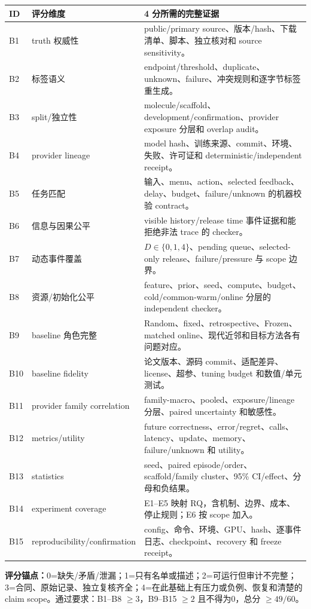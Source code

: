 \documentclass[10pt,letterpaper]{article}
\newcommand{\sect}[1]{\vspace{4pt}{\large\bfseries\color{GuideBlue}#1}\par\vspace{2pt}}
\newenvironment{clean}{\begin{center}\fontsize{8.55}{10.05}\selectfont\setlength{\tabcolsep}{3.7pt}\renewcommand{\arraystretch}{1.04}}{\end{center}}
\begin{document}
\sect{5. B1--B15 评分对象与门槛}
\begin{clean}
\begin{tabular}{@{}p{.08\linewidth}p{.27\linewidth}p{.51\linewidth}@{}}
\toprule
ID & 评分维度 & 4 分所需的完整证据\\
\midrule
B1 & truth 权威性 & public/primary source、版本/hash、下载清单、脚本、独立核对和 source sensitivity。\\
B2 & 标签语义 & endpoint/threshold、duplicate、unknown、failure、冲突规则和逐字节标签重生成。\\
B3 & split/独立性 & molecule/scaffold、development/confirmation、provider exposure 分层和 overlap audit。\\
B4 & provider lineage & model hash、训练来源、commit、环境、失败、许可证和 deterministic/independent receipt。\\
B5 & 任务匹配 & 输入、menu、action、selected feedback、delay、budget、failure/unknown 的机器校验 contract。\\
B6 & 信息与因果公平 & visible history/release time 事件证据和能拒绝非法 trace 的 checker。\\
B7 & 动态事件覆盖 & $D\in\{0,1,4\}$、pending queue、selected-only release、failure/pressure 与 scope 边界。\\
B8 & 资源/初始化公平 & feature、prior、seed、compute、budget、cold/common-warm/online 分层的 independent checker。\\
B9 & baseline 角色完整 & Random、fixed、retrospective、Frozen、matched online、现代近邻和目标方法各有问题对应。\\
B10 & baseline fidelity & 论文版本、源码 commit、适配差异、license、超参、tuning budget 和数值/单元测试。\\
B11 & provider family correlation & family-macro、pooled、exposure/lineage 分层、paired uncertainty 和敏感性。\\
B12 & metrics/utility & future correctness、error/regret、calls、latency、update、memory、failure/unknown 和 utility。\\
B13 & statistics & seed、paired episode/order、scaffold/family cluster、95\% CI/effect、分母和负结果。\\
B14 & experiment coverage & E1--E5 映射 RQ，含机制、边界、成本、停止规则；E6 按 scope 加入。\\
B15 & reproducibility/confirmation & config、命令、环境、GPU、hash、逐事件日志、checkpoint、recovery 和 freeze receipt。\\
\bottomrule
\end{tabular}
\end{clean}
\textbf{评分锚点：}0=缺失/矛盾/泄漏；1=只有名单或描述；2=可运行但审计不完整；3=合同、原始记录、独立复核齐全；4=在此基础上有压力或负例、恢复和清楚的 claim scope。通过要求：B1--B8 $\ge3$，B9--B15 $\ge2$ 且不得为0，总分 $\ge49/60$。
\end{document}
